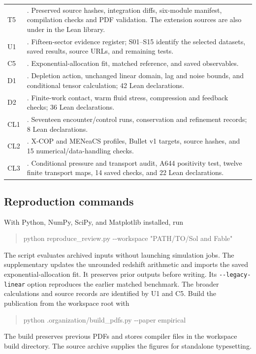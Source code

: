 \begin{longtable}{P{.065\textwidth}P{.88\textwidth}}
T5 & .
Preserved source hashes, integration diffs, six-module manifest, compilation
checks and PDF validation. The extension sources are also under
 in the Lean library. \\
U1 & .
Fifteen-sector evidence register; S01--S15 identify the selected datasets,
saved results, source URLs, and remaining tests. \\
C5 & .
Exponential-allocation fit, matched reference, and saved observables. \\
D1 & .
Depletion action, unchanged linear domain, lag and noise bounds, and
conditional tensor calculation; 42 Lean declarations. \\
D2 & .
Finite-work contact, warm fluid stress, compression and feedback checks;
36 Lean declarations. \\
CL1 & .
Seventeen encounter/control runs, conservation and refinement records;
8 Lean declarations. \\
CL2 & .
X-COP and MENeaCS profiles, Bullet v1 targets, source hashes, and
15 numerical/data-handling checks. \\
CL3 & .
Conditional pressure and transport audit, A644 positivity test, twelve
finite transport maps, 14 saved checks, and 22 Lean declarations. \\
\bottomrule
\end{longtable}
\normalsize

\subsection{Reproduction commands}

With Python, NumPy, SciPy, and Matplotlib installed, run
\begin{quote}\ttfamily
python reproduce\_review.py -{}-workspace "PATH/TO/Sol and Fable"
\end{quote}
The script evaluates archived inputs without launching simulation jobs.
The supplementary  updates the
unrounded redshift arithmetic and imports the saved exponential-allocation
fit. It preserves prior outputs before writing. Its
\texttt{-{}-legacy-linear} option reproduces the earlier matched benchmark.
The broader calculations and source records are identified by U1 and C5.
Build the publication from
the workspace root with
\begin{quote}\ttfamily
python .organization/build\_pdfs.py -{}-paper empirical
\end{quote}
The build preserves previous PDFs and stores compiler files in the
workspace build directory. The source archive supplies the figures for
standalone typesetting.

